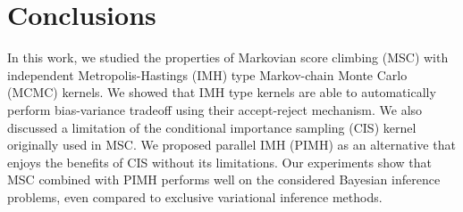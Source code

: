 
\section{Conclusions}
In this work, we studied the properties of Markovian score climbing (MSC) with independent Metropolis-Hastings (IMH) type Markov-chain Monte Carlo (MCMC) kernels.
We showed that IMH type kernels are able to automatically perform bias-variance tradeoff using their accept-reject mechanism.
We also discussed a limitation of the conditional importance sampling (CIS) kernel originally used in MSC.
We proposed parallel IMH (PIMH) as an alternative that enjoys the benefits of CIS without its limitations.
Our experiments show that MSC combined with PIMH performs well on the considered Bayesian inference problems, even compared to exclusive variational inference methods.


